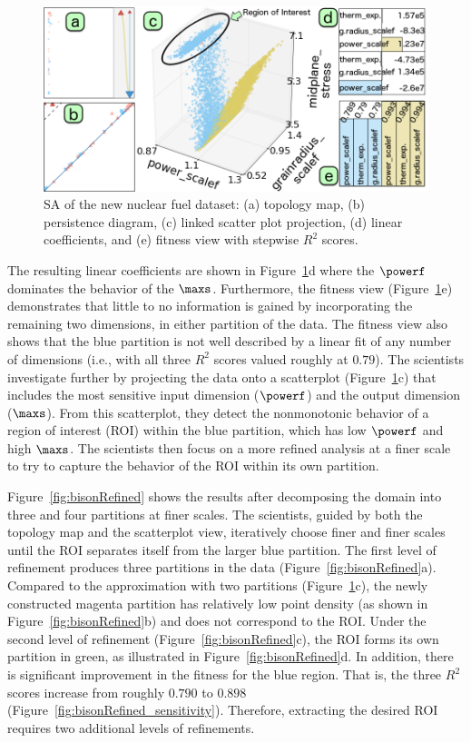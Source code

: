 \begin{figure}[htbp]
  \centering
  \includegraphics[width=.48\textwidth]{figs/chap6/bison2}
  \caption{SA of the new nuclear fuel dataset:
  (a) topology map, (b) persistence diagram, (c) linked scatter plot projection,  (d) linear coefficients, and (e) fitness view with stepwise $R^2$ scores.
  }
  \label{fig:bison}
\end{figure}

The resulting linear coefficients are shown in Figure~\ref{fig:bison}d where the $\powerf$ dominates the behavior of the $\maxs$.
%
Furthermore, the fitness view (Figure~\ref{fig:bison}e) demonstrates that little to no information is gained by incorporating the remaining two dimensions, in either partition of the data.
%
The fitness view also shows that the blue partition is not well described by a linear fit of any number of dimensions (i.e., with all three $R^2$ scores valued roughly at $0.79$).
%
The scientists investigate further by projecting the data onto a scatterplot (Figure~\ref{fig:bison}c) that includes the most sensitive input dimension ($\powerf$) and the output dimension ($\maxs$).
%
From this scatterplot, they detect the nonmonotonic behavior of a region of interest (ROI) within the blue partition, which has low $\powerf$ and high $\maxs$.
%
The scientists then focus on a more refined analysis at a finer scale to try to capture the behavior of the ROI within its own partition.

Figure~\ref{fig:bisonRefined} shows the results after decomposing the domain into three and four partitions at finer scales.
%
The scientists, guided by both the topology map and the scatterplot view, iteratively choose finer and finer scales until the ROI separates itself from the larger blue partition.
%
The first level of refinement produces three partitions in the data (Figure~\ref{fig:bisonRefined}a).
%
Compared to the approximation with two partitions (Figure~\ref{fig:bison}c), the newly constructed magenta partition has relatively low point density (as shown in Figure~\ref{fig:bisonRefined}b) and does not correspond to the ROI.
%
Under the second level of refinement (Figure~\ref{fig:bisonRefined}c), the ROI forms its own partition in green, as illustrated in Figure~\ref{fig:bisonRefined}d.
%
In addition, there is significant improvement in the fitness for the blue region.
%
That is, the three $R^2$ scores increase from roughly $0.790$ to $0.898$ (Figure~\ref{fig:bisonRefined_sensitivity}).
%
Therefore, extracting the desired ROI requires two additional levels of refinements.

